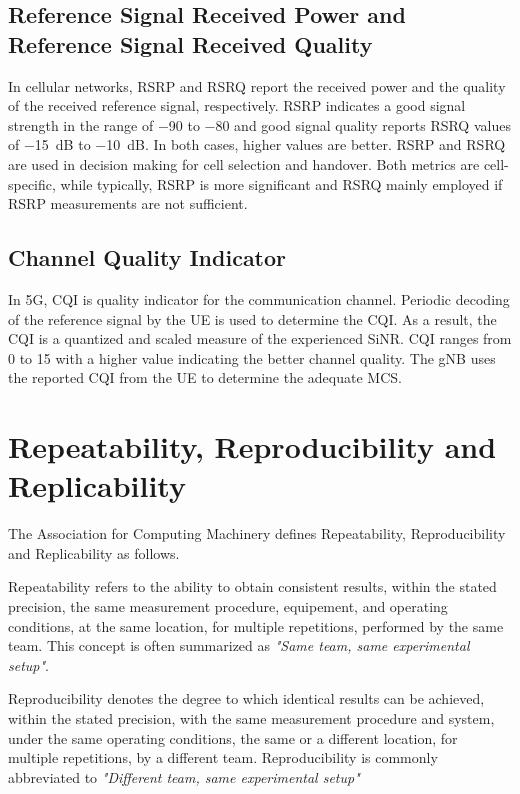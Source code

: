 \subsection{Reference Signal Received Power and Reference Signal Received Quality}

In cellular networks, \gls{RSRP} and \gls{RSRQ} report the received power and the quality of the received reference
signal, respectively.
\gls{RSRP} indicates a good signal strength in the range of \SI{-90}{\dBm} to \SI{-80}{\dBm} and
good signal quality reports \gls{RSRQ} values of \SI{-15}{\deci\bel} to \SI{-10}{\deci\bel}.
In both cases, higher values are better.
\gls{RSRP} and \gls{RSRQ} are used in decision making for cell selection and handover.
Both metrics are cell-specific, while typically, \gls{RSRP} is more significant and \gls{RSRQ} mainly
employed if \gls{RSRP} measurements are not sufficient.\cite{lazar2023realchannel,afroz2015sinr}

\subsection{Channel Quality Indicator}

In 5G, \gls{CQI} is quality indicator for the communication channel.
Periodic decoding of the reference signal by the \gls{UE} is used to determine the \gls{CQI}.
As a result, the \gls{CQI} is a quantized and scaled measure of the experienced \gls{SiNR}.
\gls{CQI} ranges from 0 to 15 with a higher value indicating the better channel quality.
The \gls{gNB} uses the reported \gls{CQI} from the \gls{UE} to determine the adequate \gls{MCS}.\cite{afroz2015sinr}



\section{Repeatability, Reproducibility and Replicability}\label{sec:back:replicability}

The Association for Computing Machinery defines Repeatability, Reproducibility and Replicability as follows.\cite{acm_reproducibility}

Repeatability refers to the ability to obtain consistent results, within the stated precision, the same measurement
procedure, equipement, and operating conditions, at the same location, for multiple repetitions, performed by the same team.
This concept is often summarized as \emph{"Same team, same experimental setup"}.

Reproducibility denotes the degree to which identical results can be achieved, within the stated precision,
with the same measurement
procedure and system, under the same operating conditions, the same or a different location, for multiple repetitions, by a different team.
Reproducibility is commonly abbreviated to \emph{"Different team, same experimental setup"}

